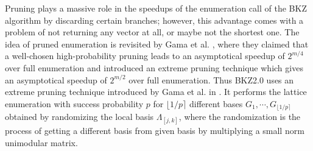 Pruning plays a massive role in the speedups of the enumeration call of the BKZ algorithm by discarding certain branches; however, this advantage comes with a problem of not returning any vector at all, or maybe not the shortest one.
The idea of pruned enumeration is revisited by Gama et al.
\cite{gama2010lattice}, where they claimed that a well-chosen high-probability pruning leads to an asymptotical speedup of $2^{m/4}$ over full enumeration and introduced an extreme pruning technique which gives an asymptotical speedup of $2^{m/2}$ over full enumeration.
Thus BKZ2.0 uses an extreme pruning technique introduced by Gama et al.
in \cite{gama2010lattice}.
It performs the lattice enumeration with success probability $p$ for $\lfloor 1/p \rceil$ different bases $G_1, \cdots, G_{\lfloor 1/p \rceil}$ obtained by randomizing the local basis $\Lambda_{[j,k]}$, where the randomization is the process of getting a different basis from given basis by multiplying a small norm unimodular matrix.




